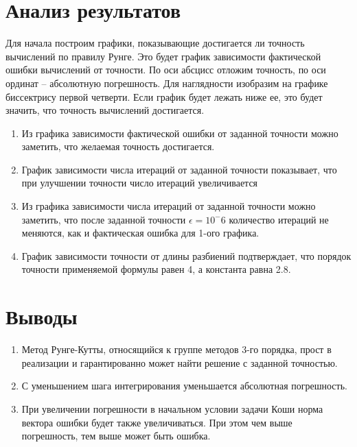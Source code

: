 \documentclass{article}
\begin{document}
	\section{Анализ результатов}
	Для начала построим графики, показывающие достигается ли точность вычислений по правилу Рунге.
	Это будет график зависимости фактической ошибки вычислений от точности.
	По оси абсцисс отложим точность, по оси ординат – абсолютную погрешность.
	Для наглядности изобразим на графике биссектрису первой четверти. Если график будет лежать ниже
	ее, это будет значить, что точность вычислений достигается.
	
	\begin{enumerate}
		\item Из графика зависимости фактической ошибки от заданной точности можно заметить, что желаемая точность достигается. 
		\item График зависимости числа итераций от заданной точности показывает, что при улучшении точности число итераций увеличивается
		\item Из графика зависимости числа итераций от заданной точности можно заметить, что после заданной точности $\epsilon = 10^-6$ количество итераций не меняются, как и фактическая ошибка для 1-ого графика.
		\item График зависимости точности от длины разбиений подтверждает, что порядок точности применяемой формулы равен 4, а константа равна 2.8.
	\end{enumerate}
	
	\section{Выводы}
	\begin{enumerate}
		\item Метод Рунге-Кутты, относящийся к группе методов 3-го порядка, прост в реализации и гарантированно может найти решение с заданной точностью.
		\item С уменьшением шага интегрирования уменьшается абсолютная погрешность.
		\item При увеличении погрешности в начальном условии задачи Коши норма вектора ошибки будет также увеличиваться. При этом чем выше погрешность, тем выше может быть ошибка.

	\end{enumerate}
	
\end{document}
